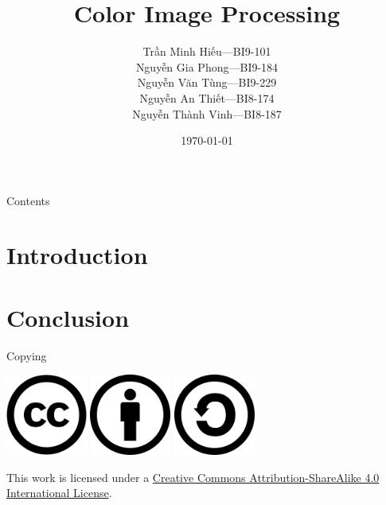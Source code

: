 \documentclass[pdf]{beamer}
\title{Color Image Processing}
\author[Group 1]{Trần Minh Hiếu---BI9-101\\
                 Nguyễn Gia Phong---BI9-184\\
                 Nguyễn Văn Tùng---BI9-229\\
                 Nguyễn An Thiết---BI8-174\\
                 Nguyễn Thành Vinh---BI8-187}
\institute{University of Science and Technology of Hà Nội}
\date{\selectlanguage{english}\today}
\begin{document}
\frame{\titlepage}
\begin{frame}{Contents}
  \tableofcontents
\end{frame}

\section{Introduction}
\frame{\tableofcontents[currentsection]}

\section{Conclusion}
\frame{\tableofcontents[currentsection]}
\begin{frame}{Copying}\Large
  \begin{center}
    \includegraphics[width=0.2\textwidth]{CC.png}
    \includegraphics[width=0.2\textwidth]{BY.png}
    \includegraphics[width=0.2\textwidth]{SA.png}
  \end{center}

  This work is licensed under a
  \href{https://creativecommons.org/licenses/by-sa/4.0/}{Creative Commons
  Attribution-ShareAlike 4.0 International License}.
\end{frame}
\end{document}
